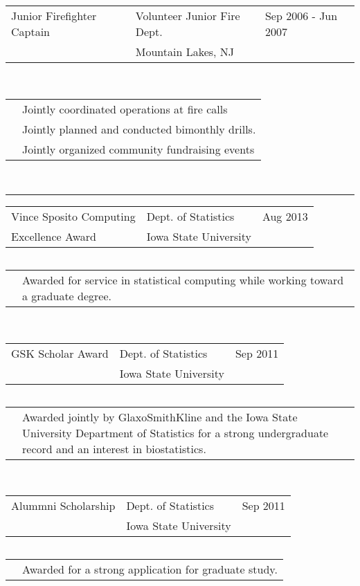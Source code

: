 \documentclass{article}
\newcommand{\q}{$\quad$ \newline}
\newcommand{\vl}{4.25}
\newcommand{\wl}{8.4}
\newcommand{\ww}{13}
\newcommand{\myrule}{\noindent \rule{\textwidth}{1pt}}
\begin{document}
\noindent \begin{tabular}{@{}p{\vl cm}p{\wl cm}l@{}}
Junior Firefighter Captain & Volunteer Junior Fire Dept. & Sep 2006 - Jun 2007 \\
& Mountain Lakes, NJ &
\end{tabular} \q \q

\noindent \begin{tabular}{@{}p{\vl cm}p{\ww cm}@{}}
& Jointly coordinated operations at fire calls \\
& Jointly planned and conducted bimonthly drills. \\
& Jointly organized community fundraising events
\end{tabular} \q \q 

 
\myrule

\noindent \begin{tabular}{@{}p{\vl cm}p{\wl cm}l@{}}
Vince Sposito Computing & Dept. of Statistics & Aug 2013 \\
Excellence Award & Iowa State University &
\end{tabular} \q

\noindent \begin{tabular}{@{}p{\vl cm}p{\ww cm}@{}}
& Awarded for service in statistical computing while working toward a graduate degree.
\end{tabular} \q \q

\noindent \begin{tabular}{@{}p{\vl cm}p{\wl cm}l@{}}
GSK Scholar Award & Dept. of Statistics & Sep 2011 \\
& Iowa State University &
\end{tabular} \q

\noindent \begin{tabular}{@{}p{\vl cm}p{\ww cm}@{}}
& Awarded jointly by GlaxoSmithKline and the Iowa State University Department of Statistics for a strong undergraduate record and an interest in biostatistics.
\end{tabular} \q \q

\noindent \begin{tabular}{@{}p{\vl cm}p{\wl cm}l@{}}
Alummni Scholarship & Dept. of Statistics & Sep 2011 \\
& Iowa State University &
\end{tabular} \q

\noindent \begin{tabular}{@{}p{\vl cm}p{\ww cm}@{}}
& Awarded for a strong application for graduate study.
\end{tabular} \q \q
\end{document}
